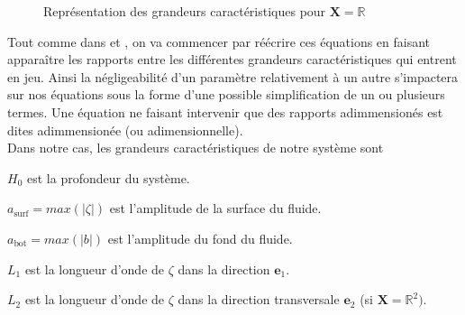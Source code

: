\documentclass[12pt,a4paper]{article}
\numberwithin{equation}{section}
\begin{document}
\begin{figure}[H]
    \centering
    \caption{Représentation des grandeurs caractéristiques pour $\textbf{X} = \mathbb{R}$ }
    \label{fig:surface}
\end{figure}
Tout comme dans \cite{MT} et  \cite{Lannes}, on va commencer par réécrire ces équations en faisant apparaître les rapports entre les différentes grandeurs caractéristiques qui entrent en jeu. Ainsi la négligeabilité d'un paramètre relativement à un autre s'impactera sur nos équations sous la forme d'une possible simplification de un ou plusieurs termes. Une équation ne faisant intervenir que des rapports adimmensionés est dites adimmensionée (ou adimensionnelle). 
\\

Dans notre cas, les grandeurs caractéristiques de notre système sont

\begin{list}{\textbullet}{}
    \item $H_0$ est la profondeur du système.
    \item $a_{\text{surf}} = max(|\zeta|)$ est l'amplitude de la surface du fluide.
    \item $a_{\text{bot}} = max(|b|)$ est l'amplitude du fond du fluide.
    \item $L_1$ est la longueur d'onde de $\zeta$ dans la direction $\textbf{e}_1$.
    \item $L_2$ est la longueur d'onde de $\zeta$ dans la direction transversale $\textbf{e}_2$ (si $\textbf{X} = \mathbb{R}^2)$.
    
 \end{list}
\,
\\
\end{document}
